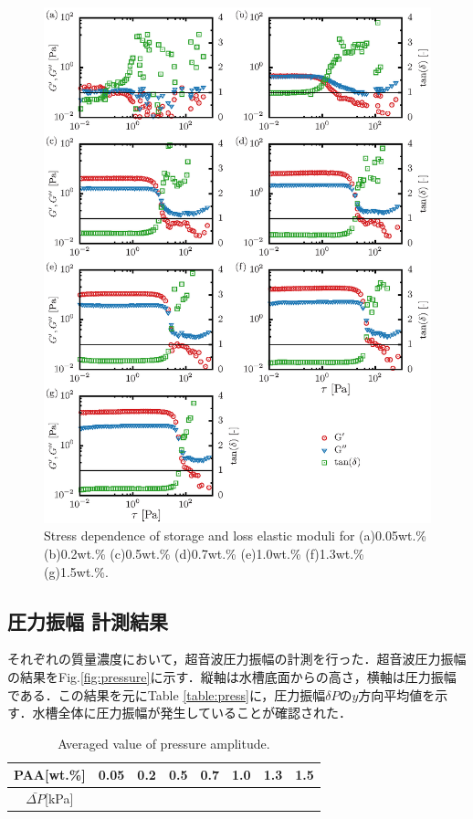 \begin{figure}[ht]
	\centering
	\includegraphics[width=12cm,clip]{4-Results/elastic_modulus.eps}
	\caption{Stress dependence of storage and loss elastic moduli for (a)0.05wt.\% (b)0.2wt.\% (c)0.5wt.\% (d)0.7wt.\% (e)1.0wt.\% (f)1.3wt.\% (g)1.5wt.\%.}
	\label{fig:PAA-elast}
\end{figure}

\newpage

\subsection{圧力振幅 計測結果}

それぞれの質量濃度において，超音波圧力振幅の計測を行った．超音波圧力振幅の結果をFig.\ref{fig:pressure}に示す．縦軸は水槽底面からの高さ，横軸は圧力振幅である．この結果を元にTable \ref{table:press}に，圧力振幅$\delta{}P$の$y$方向平均値を示す．水槽全体に圧力振幅が発生していることが確認された．

\begin{table}[h]
	\centering
	\caption{Averaged value of pressure amplitude.}
	\label{table:press-A}
	\begin{tabular}{c|c|c|c|c|c|c|c} \hline
		PAA[wt.\%]             & 0.05 & 0.2 & 0.5 & 0.7 & 1.0 & 1.3 & 1.5 \\ \hline \hline
		$\bar{\Delta{}P}$[kPa] &      &     &     &     &     &     &     \\ \hline
	\end{tabular}
\end{table}


